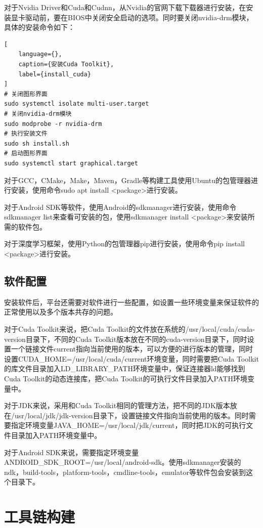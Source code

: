 对于Nvidia Driver和Cuda和Cudnn，从Nvidia的官网下载下载器进行安装，在安装显卡驱动前，要在BIOS中关闭安全启动的选项。同时要关闭nvidia-drm模块，具体的安装命令如下：

\begin{lstlisting}[
    language={},
    caption={安装Cuda Toolkit},
    label={install_cuda}
]
# 关闭图形界面
sudo systemctl isolate multi-user.target
# 关闭nvidia-drm模块
sudo modprobe -r nvidia-drm
# 执行安装文件
sudo sh install.sh
# 启动图形界面
sudo systemctl start graphical.target
\end{lstlisting}

对于GCC，CMake，Make，Maven，Gradle等构建工具使用Ubuntu的包管理器进行安装，使用命令sudo apt install <package>进行安装。

对于Android SDK等软件，使用Android的sdkmanager进行安装，使用命令sdkmanager \-\-list来查看可安装的包，使用sdkmanager \-\-install <package>来安装所需的软件包。

对于深度学习框架，使用Python的包管理器pip进行安装，使用命令pip install <package>进行安装。


\subsection{软件配置}

安装软件后，平台还需要对软件进行一些配置，如设置一些环境变量来保证软件的正常使用以及多个版本共存的问题。

对于Cuda Toolkit来说，把Cuda Toolkit的文件放在系统的/usr/local/cuda/cuda-version目录下，不同的Cuda Toolkit版本放在不同的cuda-version目录下，同时设置一个链接文件current指向当前使用的版本，可以方便的进行版本的管理，同时设置CUDA\_HOME=/usr/local/cuda/current环境变量，同时需要把Cuda Toolkit的库文件目录加入LD\_LIBRARY\_PATH环境变量中，保证连接器ld能够找到Cuda Toolkit的动态连接库，把Cuda Toolkit的可执行文件目录加入PATH环境变量中。

对于JDK来说，采用和Cuda Toolkit相同的管理方法，把不同的JDK版本放在/usr/local/jdk/jdk-version目录下，设置链接文件指向当前使用的版本。同时需要指定环境变量JAVA\_HOME=/usr/local/jdk/current，同时把JDK的可执行文件目录加入PATH环境变量中。

对于Android SDK来说，需要指定环境变量ANDROID\_SDK\_ROOT=/usr/local/android-sdk。使用sdkmanager安装的ndk，build-tools，platform-tools，cmdline-tools，emulator等软件包会安装到这个目录下。


\section{工具链构建}

